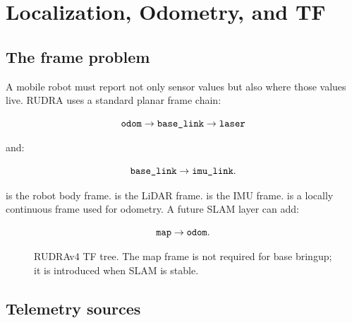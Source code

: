 \chapter{Localization, Odometry, and TF}

\section{The frame problem}

A mobile robot must report not only sensor values but also where those values live. RUDRA uses a standard planar frame chain:

\begin{equation}
\cmd{odom} \rightarrow \cmd{base_link} \rightarrow \cmd{laser}
\end{equation}

and:

\begin{equation}
\cmd{base_link} \rightarrow \cmd{imu_link}.
\end{equation}

 is the robot body frame.  is the LiDAR frame.  is the IMU frame.  is a locally continuous frame used for odometry. A future SLAM layer can add:

\begin{equation}
\cmd{map} \rightarrow \cmd{odom}.
\end{equation}

\begin{figure}[htbp]
\centering
{}
\caption{RUDRAv4 TF tree. The map frame is not required for base bringup; it is introduced when SLAM is stable.}
\end{figure}

\section{Telemetry sources}

